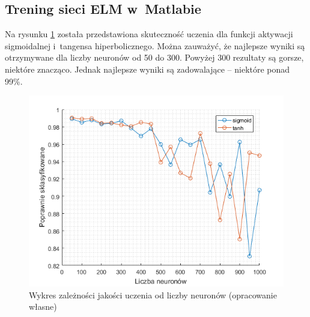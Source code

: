 \documentclass[pl]{minipw} %
\begin{document}
\subsection{Trening sieci ELM w~Matlabie}
Na rysunku \ref{dota_liczba_neuronow} została przedstawiona skuteczność uczenia dla funkcji aktywacji sigmoidalnej i~tangensa hiperbolicznego.
Można zauważyć, że najlepsze wyniki są otrzymywane dla liczby neuronów od 50 do 300.
Powyżej 300 rezultaty są gorsze, niektóre znacząco.
Jednak najlepsze wyniki są zadowalające -- niektóre ponad 99\%.
\label{matlab-dota}
\begin{figure}[H]
\centering
\includegraphics[width=\textwidth]{dota_liczba_neuronow.png}
\caption[Wykres zależności jakości uczenia od liczby neuronów]{Wykres zależności jakości uczenia od liczby neuronów (opracowanie własne)}
\label{dota_liczba_neuronow}
\end{figure}
\end{document}
